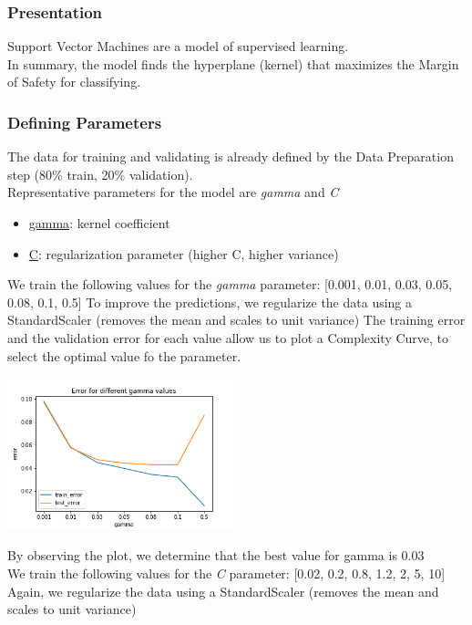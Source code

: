 \subsubsection{Presentation}
Support Vector Machines are a model of supervised learning.\\
In summary, the model finds the hyperplane (kernel) that maximizes the Margin of Safety for classifying.

\subsubsection{Defining Parameters}
The data for training and validating is already defined by the Data Preparation step (80\% train, 20\% validation).\\
Representative parameters for the model are \emph{gamma} and \emph{C}
\begin{itemize}
    \item \underline{gamma}: kernel coefficient
    \item \underline{C}: regularization parameter (higher C, higher variance)
\end{itemize}
We train the following values for the \emph{gamma} parameter: [0.001, 0.01, 0.03, 0.05, 0.08, 0.1, 0.5]
To improve the predictions, we regularize the data using a StandardScaler (removes the mean and scales to unit variance)
The training error and the validation error for each value allow us to plot a Complexity Curve, to select the optimal value fo the parameter.
\begin{center}
    \captionsetup{type=figure}
    \includegraphics[width=250px]{comp_curve_svm_gamma.png}
\end{center}
By observing the plot, we determine that the best value for gamma is 0.03\\
We train the following values for the \emph{C} parameter: [0.02, 0.2, 0.8, 1.2, 2, 5, 10]\\
Again, we regularize the data using a StandardScaler (removes the mean and scales to unit variance)\\
